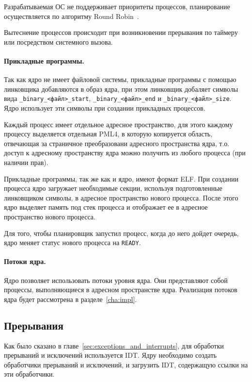 Разрабатываемая ОС не поддерживает приоритеты процессов, планирование осуществляется
по алгоритму Round Robin~\cite{tanenbaum}.

Вытеснение процессов происходит при возникновении прерывания по таймеру или посредством
системного вызова.

\paragraph{Прикладные программы.} Так как ядро не имеет файловой системы, прикладные
программы с помощью линковщика добавляются в образ ядра, при этом линковщик добаляет
символы вида \texttt{\_binary\_<файл>\_start}, \texttt{\_binary\_<файл>\_end} и
\texttt{\_binary\_<файл>\_size}. Ядро использует эти символы при создании прикладных процессов.

Каждый процесс имеет отдельное адресное пространство, для этого каждому процессу выделяется
отдельная PML4, в которую копируется область, отвечающая за страничное преобразовани адресного
пространства ядра, т.о. доступ к адресному пространству ядра можно получить из любого процесса
(при наличии прав).

Прикладные программы, так же как и ядро, имеют формат ELF. При создании процесса
ядро загружает необходимые секции, используя подготовленные линковщиком символы, в адресное
пространство нового процесса. После этого ядро выделяет память под стек процесса и отображает
ее в адресное пространство нового процесса.

Для того, чтобы планировщик запустил процесс, когда до него дойдет очередь, ядро
меняет статус нового процесса на \texttt{READY}.

\paragraph{Потоки ядра.} Ядро позволяет использовать потоки уровня ядра.
Они представляют собой процессы, выполняющиеся в адресном пространстве ядра.
Реализация потоков ядра будет рассмотрена в разделе~\ref{cha:impl}.

\subsection{Прерывания}
Как было сказано в главе~\ref{sec:exceptions_and_interrupts}, для обработки прерываний
и исключений используется IDT. Ядру необходимо создать обработчики прерываний и исключений,
и загрузить IDT, содержащую ссылки на эти обработчики.

